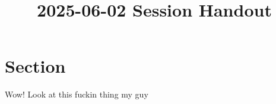 \documentclass{article}
\title{2025-06-02 Session Handout}
\begin{document}
\section{Section}

Wow! Look at this fuckin thing my guy
\end{document}

